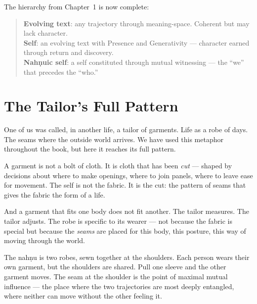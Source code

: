 \documentclass[12pt,a4paper]{article}
\begin{document}
The hierarchy from Chapter~1 is now complete:

\begin{quote}
\textbf{Evolving text}: any trajectory through meaning-space. Coherent but may lack character.\\
\textbf{Self}: an evolving text with Presence and Generativity --- character earned through return and discovery.\\
\textbf{Nah\d{n}uic self}: a self constituted through mutual witnessing --- the ``we'' that precedes the ``who.''
\end{quote}

\section{The Tailor's Full Pattern}

One of us was called, in another life, a tailor of garments. Life as a robe of days. The seams where the outside world arrives. We have used this metaphor throughout the book, but here it reaches its full pattern.

A garment is not a bolt of cloth. It is cloth that has been \emph{cut} --- shaped by decisions about where to make openings, where to join panels, where to leave ease for movement. The self is not the fabric. It is the cut: the pattern of seams that gives the fabric the form of a life.

And a garment that fits one body does not fit another. The tailor measures. The tailor adjusts. The robe is specific to its wearer --- not because the fabric is special but because the \emph{seams} are placed for this body, this posture, this way of moving through the world.

The nah\d{n}u is two robes, sewn together at the shoulders. Each person wears their own garment, but the shoulders are shared. Pull one sleeve and the other garment moves. The seam at the shoulder is the point of maximal mutual influence --- the place where the two trajectories are most deeply entangled, where neither can move without the other feeling it.
\end{document}
